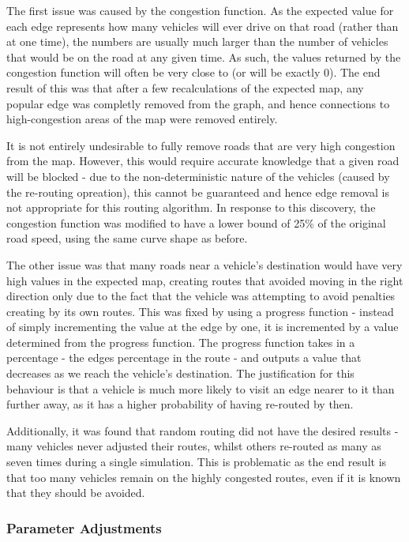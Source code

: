 \documentclass[ %
                    author={Alexander Hill},
                supervisor={Dr. Benjamin Sach},
                    degree={MEng},
                     title={MARMOSET},
                  subtitle={Multi-Agent Route Management using Online Simulation for Efficient Transportation},
                      type={research},
                      year={2016} ]{dissertation}
\begin{document}
The first issue was caused by the congestion function. As the expected value
for each edge represents how many vehicles will ever drive on that road (rather
than at one time), the numbers are usually much larger than the number of
vehicles that would be on the road at any given time. As such, the values
returned by the congestion function will often be very close to (or will be
exactly 0). The end result of this was that after a few recalculations of the
expected map, any popular edge was completly removed from the graph, and hence
connections to high-congestion areas of the map were removed entirely.

It is not entirely undesirable to fully remove roads that are very high
congestion from the map. However, this would require accurate knowledge that a
given road will be blocked - due to the non-deterministic nature of the vehicles
(caused by the re-routing opreation), this cannot be guaranteed and hence edge
removal is not appropriate for this routing algorithm. In response to this
discovery, the congestion function was modified to have a lower bound of 25\% of
the original road speed, using the same curve shape as before.

The other issue was that many roads near a vehicle's destination would have very
high values in the expected map, creating routes that avoided moving in the
right direction only due to the fact that the vehicle was attempting to avoid
penalties creating by its own routes. This was fixed by using a progress
function - instead of simply incrementing the value at the edge by one, it is
incremented by a value determined from the progress function. The progress
function takes in a percentage - the edges percentage in the route - and outputs
a value that decreases as we reach the vehicle's destination. The justification
for this behaviour is that a vehicle is much more likely to visit an edge
nearer to it than further away, as it has a higher probability of having
re-routed by then.

Additionally, it was found that random routing did not have the desired results
- many vehicles never adjusted their routes, whilst others re-routed as many as
seven times during a single simulation. This is problematic as the end result is
that too many vehicles remain on the highly congested routes, even if it is
known that they should be avoided.

\subsubsection{Parameter Adjustments}\label{sec:parms}
\end{document}
